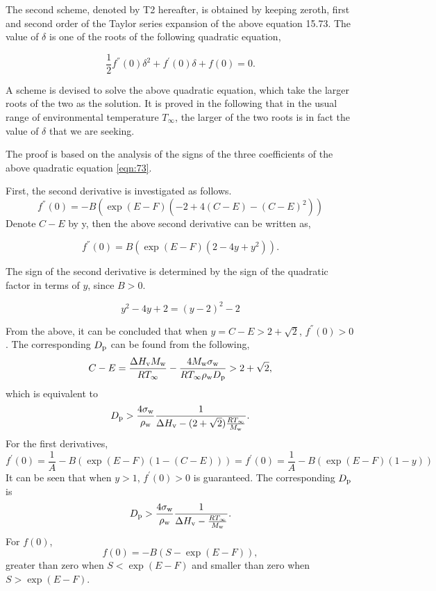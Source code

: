 \documentclass[12pt]{article}
\begin{document}
{The second scheme, denoted by T2 hereafter, is obtained by keeping zeroth, first and second order of the Taylor series expansion of the above equation 15.73. The value of $\delta$ is one of the roots of the following quadratic equation,

\begin{equation}\label{eqn:73}
\frac{1}{2}f^{''}(0)\delta^{2}+f^{'}(0)\delta+f(0)=0.
\end{equation}

A scheme is devised to solve the above quadratic equation, which take the larger roots of the two as the solution. 
It is proved in the following that in the usual range of environmental temperature $T_{\infty}$,  the larger of the two roots is in fact the value of $\delta$ that we are seeking. 

The proof is based on the analysis of the signs of the three coefficients of the above quadratic equation \ref{eqn:73}.

First, the second derivative is investigated as follows.
\begin{equation}
f^{''}(0)=-B(\exp(E-F)(-2+4(C-E)-(C-E)^2))
\end{equation}
Denote $C-E$ by y, then the above second derivative can be written as,

\begin{equation}
f^{''}(0)=B(\exp(E-F)(2-4y+y^2)).
\end{equation}

The sign of the second derivative is determined by the sign of the quadratic factor in terms of $y$, 
since $B>0$.

\begin{equation}
y^2-4y+2=(y-2)^2-2
\end{equation}

From the above, it can be concluded that when $y=C-E>2+\sqrt{2}$, $f^{''}(0)>0$.
The corresponding $D_{\rm p}$ can be found from the following,
\begin{equation}\label{eqn:77}
C-E=\frac{\Delta H_{\rm v}M_{\rm w}}{RT_{\infty}}-\frac{4M_{\rm w}\sigma_{\rm w}}{RT_{\infty}\rho_{\rm w}D_{\rm p}}>2+\sqrt{2},
\end{equation} 
which is equivalent to 
\begin{equation}\label{eqn:78}
D_{\rm p}>\frac{4 \sigma_{\rm w}}{\rho_{\rm w}}\frac{1}{\Delta H_{\rm v}-(2+\sqrt{2})\frac{R T_{\infty}}{M_{\rm w}}}.
\end{equation}
For the first derivatives, 
\begin{equation}\label{eqn:79}
f^{'}(0)=\frac{1}{A}-B(\exp(E-F)(1-(C-E)))=f^{'}(0)=\frac{1}{A}-B(\exp(E-F)(1-y))
\end{equation}
It can be seen that when $y>1$, $f^{'}(0)>0$ is guaranteed. The corresponding $D_{\rm p}$ is
\begin{equation}\label{eqn:80}
D_{\rm p}>\frac{4 \sigma_{\rm w}}{\rho_{\rm w}}\frac{1}{\Delta H_{\rm v}-\frac{R T_{\infty}}{M_{\rm w}}}.
\end{equation}
 For $f(0)$, 
\begin{equation}\label{eqn:81}
f(0)=-B(S-\exp(E-F)),
\end{equation} 
greater than zero when $S<\exp(E-F)$ and smaller than zero when $S>\exp(E-F)$.

}
\end{document}
